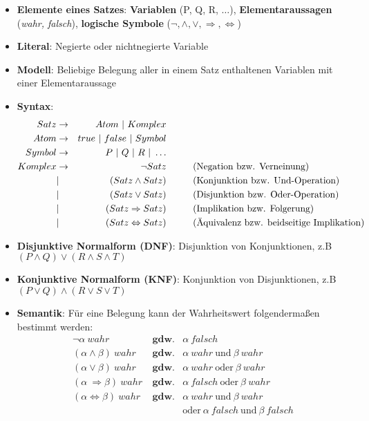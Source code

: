 \begin{itemize}
	\item \textbf{Elemente eines Satzes}: \textbf{Variablen} (P, Q, R, $\dots$), \textbf{Elementaraussagen} (\textit{wahr, falsch}), \textbf{logische Symbole} ($\neg, \land, \lor, \Rightarrow, \Leftrightarrow$)
	\item \textbf{Literal}: Negierte oder nichtnegierte Variable
	\item \textbf{Modell}: Beliebige Belegung aller in einem Satz enthaltenen Variablen mit einer Elementaraussage
	\item \textbf{Syntax}:
		\begin{align*}
			Satz 	&\rightarrow 	&Atom\ |\ Komplex				&\\
			Atom 	&\rightarrow 	&true\ |\ false\ |\ Symbol 		&\\
			Symbol 	&\rightarrow 	&P\ |\ Q\ |\ R\ |\ \dots 		&\\
			Komplex &\rightarrow 	&\neg Satz 						&\hspace*{1cm} (\text{Negation bzw. Verneinung})\\
					& 				|\ &(Satz \land Satz) 			&\hspace*{1cm} (\text{Konjunktion bzw. Und-Operation})\\
					& 				|\ &(Satz \lor Satz) 			&\hspace*{1cm} (\text{Disjunktion bzw. Oder-Operation})\\
					& 				|\ &(Satz \Rightarrow Satz) 	&\hspace*{1cm} (\text{Implikation bzw. Folgerung})\\
					& 				|\ &(Satz \Leftrightarrow Satz) &\hspace*{1cm} (\text{Äquivalenz bzw. beidseitige Implikation})
		\end{align*}
	\item \textbf{Disjunktive Normalform (DNF)}: Disjunktion von Konjunktionen, z.B $(P \land Q) \lor (R \land S \land T)$
	\item \textbf{Konjunktive Normalform (KNF)}: Konjunktion von Disjunktionen, z.B $(P \lor Q) \land (R \lor S \lor T)$
	\item \textbf{Semantik}: Für eine Belegung kann der Wahrheitswert folgendermaßen bestimmt werden:
		\begin{align*}
			\neg\alpha\ wahr 						&\ \mathbf{gdw.} & \alpha\ falsch\\
			(\alpha \land \beta)\ wahr 				&\ \mathbf{gdw.} & \alpha\ wahr\ \text{und}\ \beta\ wahr\\
			(\alpha \lor \beta)\ wahr 				&\ \mathbf{gdw.} & \alpha\ wahr\ \text{oder}\ \beta\ wahr\\
			(\alpha\ \Rightarrow \beta)\ wahr 		&\ \mathbf{gdw.} & \alpha\ falsch\ \text{oder}\ \beta\ wahr\\
			(\alpha \Leftrightarrow \beta)\ wahr 	&\ \mathbf{gdw.} & \alpha\ wahr\ \text{und}\ \beta\ wahr\\
												 	& 				 &\text{oder}\ \alpha\ falsch\ \text{und}\ \beta\ falsch
		\end{align*}
\end{itemize}

